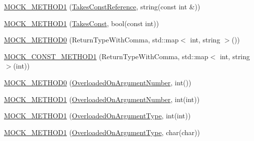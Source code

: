 \begin{DoxyCompactItemize}
\item 
\hyperlink{classtesting_1_1gmock__generated__function__mockers__test_1_1_mock_foo_a605c84c3375d02769b0288d7637b552f}{M\+O\+C\+K\+\_\+\+M\+E\+T\+H\+O\+D1} (\hyperlink{classtesting_1_1gmock__generated__function__mockers__test_1_1_foo_interface_a3db03c9698ecddfc62f2a1ed2f3c32c2}{Takes\+Const\+Reference}, string(const int \&))
\item 
\hyperlink{classtesting_1_1gmock__generated__function__mockers__test_1_1_mock_foo_a7b548776b156454bcddecaca6294c52f}{M\+O\+C\+K\+\_\+\+M\+E\+T\+H\+O\+D1} (\hyperlink{classtesting_1_1gmock__generated__function__mockers__test_1_1_foo_interface_a8c53e87edf0b9da878e5259f02b7f5dc}{Takes\+Const}, bool(const int))
\item 
\hyperlink{classtesting_1_1gmock__generated__function__mockers__test_1_1_mock_foo_a5fb8c71ba44b97fbc8945905a9835215}{M\+O\+C\+K\+\_\+\+M\+E\+T\+H\+O\+D0} (Return\+Type\+With\+Comma, std\+::map$<$ int, string $>$())
\item 
\hyperlink{classtesting_1_1gmock__generated__function__mockers__test_1_1_mock_foo_a777b7b57ac125e2fe868e6cda46833fc}{M\+O\+C\+K\+\_\+\+C\+O\+N\+S\+T\+\_\+\+M\+E\+T\+H\+O\+D1} (Return\+Type\+With\+Comma, std\+::map$<$ int, string $>$(int))
\item 
\hyperlink{classtesting_1_1gmock__generated__function__mockers__test_1_1_mock_foo_a1666c565d1b48b351a1a453f6f87ff22}{M\+O\+C\+K\+\_\+\+M\+E\+T\+H\+O\+D0} (\hyperlink{classtesting_1_1gmock__generated__function__mockers__test_1_1_foo_interface_ae9e86ac64fa9acedfb1fa747174c7f43}{Overloaded\+On\+Argument\+Number}, int())
\item 
\hyperlink{classtesting_1_1gmock__generated__function__mockers__test_1_1_mock_foo_a45014dba5c27e9d59af3a94e0d324096}{M\+O\+C\+K\+\_\+\+M\+E\+T\+H\+O\+D1} (\hyperlink{classtesting_1_1gmock__generated__function__mockers__test_1_1_foo_interface_ae9e86ac64fa9acedfb1fa747174c7f43}{Overloaded\+On\+Argument\+Number}, int(int))
\item 
\hyperlink{classtesting_1_1gmock__generated__function__mockers__test_1_1_mock_foo_ad900c5945fc52a0a95ca1480207c7add}{M\+O\+C\+K\+\_\+\+M\+E\+T\+H\+O\+D1} (\hyperlink{classtesting_1_1gmock__generated__function__mockers__test_1_1_foo_interface_ad9cc9a11570403fb8378ed6620892ec6}{Overloaded\+On\+Argument\+Type}, int(int))
\item 
\hyperlink{classtesting_1_1gmock__generated__function__mockers__test_1_1_mock_foo_ab4b323a9c06a48c1116d55419195c1a6}{M\+O\+C\+K\+\_\+\+M\+E\+T\+H\+O\+D1} (\hyperlink{classtesting_1_1gmock__generated__function__mockers__test_1_1_foo_interface_ad9cc9a11570403fb8378ed6620892ec6}{Overloaded\+On\+Argument\+Type}, char(char))

\end{DoxyCompactItemize}

